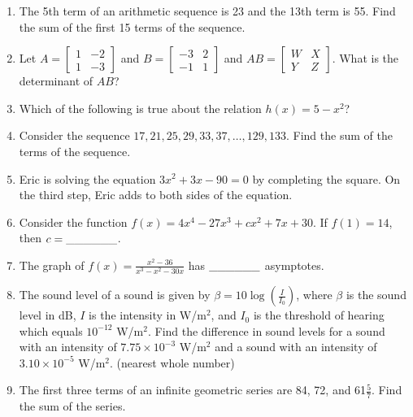 \documentclass[../uilmath.tex]{subfiles}
\begin{document}
\begin{enumerate}[label=\bfseries\arabic*.]
    \item %
    The 5th term of an arithmetic sequence is 23 and the 13th term is 55. Find the sum of the first 15 terms of the sequence. 

    \item %
    Let $A = \begin{bmatrix}
        1  & -2\\
        1 & -3
        \end{bmatrix}$ and $B=\begin{bmatrix}
            -3 & 2\\
            -1 & 1 
        \end{bmatrix}$ and $AB = \begin{bmatrix}
            W & X \\
            Y & Z
        \end{bmatrix}$. What is the determinant of $AB$?

        \item %
        Which of the following is true about the relation $h(x)=5-x^2$?

        \item %
        Consider the sequence $17,21,25,29,33,37,\dots,129,133$. Find the sum of the terms of the sequence.

        \item %
        Eric is solving the equation $3x^2+3x-90=0$ by completing the square. On the third step, Eric adds \blank to both sides of the equation.

        \item %
        Consider the function $f(x)=4x^4-27x^3+cx^2+7x+30$. If $f(1)=14$, then $c=\_\_\_\_\_\_$.

        \item %
        The graph of $f(x)=\frac{x^2-36}{x^3-x^2-30x}$ has $\_\_\_\_\_\_$ asymptotes.

        \item %
        The sound level of a sound is given by $\beta = 10\log\left(\frac{I}{I_0}\right)$, where $\beta$ is the sound level in dB, $I$ is the intensity
        in W/m$^2$, and $I_0$ is the threshold of hearing which equals $10^{-12}$ W/m$^2$. Find the difference in sound levels for a sound with an 
        intensity of $7.75\times 10^{-3}$ W/m$^2$ and a sound with an intensity of $3.10\times 10^{-5}$ W/m$^2$. (nearest whole number)
        
        \item %
        The first three terms of an infinite geometric series are 84, 72, and 61$\frac{5}{7}$. Find the sum of the series.


\end{enumerate}
\end{document}
